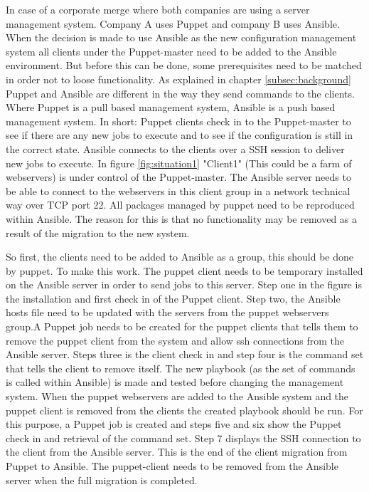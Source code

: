 In case of a corporate merge where both companies are using a server management system. Company A uses Puppet and company B uses Ansible. When the decision is made to use Ansible as the new configuration management system all clients under the Puppet-master need to be added to the Ansible environment. But before this can be done, some prerequisites need to be matched in order not to loose functionality.
As explained in chapter \ref{subsec:background} Puppet and Ansible are different in the way they send commands to the clients. Where Puppet is a pull based management system, Ansible is a push based management system. In short: Puppet clients check in to the Puppet-master to see if there are any new jobs to execute and to see if the configuration is still in the correct state. Ansible connects to the clients over a SSH session to deliver new jobs to execute. In figure \ref{fig:situation1} "Client1" (This could be a farm of webservers) is under control of the Puppet-master. The Ansible server needs to be able to connect to the webservers in this client group in a network technical way over TCP port 22. All packages managed by puppet need to be reproduced within Ansible. The reason for this is that no functionality may be removed as a result of the migration to the new system. 

So first, the clients need to be added to Ansible as a group, this should be done by puppet. To make this work. The puppet client needs to be temporary installed on the Ansible server in order to send jobs to this server. Step one in the figure is the installation and first check in of the Puppet client. Step two, the Ansible hosts file need to be updated with the servers from the puppet webservers group.A Puppet job needs to be created for the puppet clients that tells them to remove the puppet client from the system and allow ssh connections from the Ansible server. Steps three is the client check in and step four is the command set that tells the client to remove itself. The new playbook (as the set of commands is called within Ansible) is made and tested before changing the management system. When the puppet webservers are added to the Ansible system and the puppet client is removed from the clients the created playbook should be run. For this purpose, a Puppet job is created and steps five and six show the Puppet check in and retrieval of the command set. Step 7 displays the SSH connection to the client from the Ansible server. This is the end of the client migration from Puppet to Ansible. The puppet-client needs to be removed from the Ansible server when the full migration is completed.  


